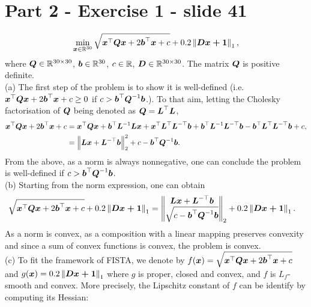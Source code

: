 \section{Part 2 - Exercise 1 - slide 41}
%
\begin{equation*}
    \min_{\boldsymbol x \in \mathbb{R}^{30}} \sqrt{\boldsymbol x^\top \boldsymbol{Qx} + 
    2 \boldsymbol b^\top \boldsymbol x + c} + 0.2 \left\lVert\boldsymbol{Dx+\boldsymbol 1}\right\rVert_{1},
\end{equation*}
%
where $\boldsymbol Q \in \mathbb{R}^{30\times 30}$, $\boldsymbol b\in \mathbb{R}^{30}$, $c\in \mathbb{R}$, $\boldsymbol D
\in \mathbb{R}^{30\times 30}$. The matrix $\boldsymbol Q$ is positive definite. \\

\indent (a) The first step of the problem is to show it is well-defined (i.e. $\boldsymbol x^\top \boldsymbol{Qx} + 
2 \boldsymbol b^\top \boldsymbol x + c\geq 0$ if $c> \boldsymbol b^\top\boldsymbol Q^{-1} \boldsymbol b$.). To that aim, letting the Cholesky factorisation of $\boldsymbol Q$ being denoted as $\boldsymbol Q = \boldsymbol L^\top \boldsymbol L$, 
\begin{align*}
	\boldsymbol x^\top \boldsymbol{Qx} + 
2 \boldsymbol b^\top \boldsymbol x + c &= \boldsymbol x^\top \boldsymbol{Qx} + \boldsymbol b^\top \boldsymbol L^{-1} \boldsymbol{Lx} + \boldsymbol x^\top \boldsymbol L^\top \boldsymbol L^{-\top} \boldsymbol b + \boldsymbol b^{\top} \boldsymbol L^{-1} \boldsymbol L^{-\top} \boldsymbol b - \boldsymbol b^\top \boldsymbol L^\top \boldsymbol L^{-\top} \boldsymbol b + c,\\
&= \left \| \boldsymbol{Lx} + \boldsymbol L^{-\top} \boldsymbol b \right \|_2^2 + c -\boldsymbol b^\top\boldsymbol Q^{-1} \boldsymbol b. 
\end{align*}  
From the above, as a norm is always nonnegative, one can conclude the problem is well-defined if $c> \boldsymbol b^\top\boldsymbol Q^{-1} \boldsymbol b$.   \\
%
\indent (b) Starting from the norm expression, one can obtain 
\begin{align*}
	\sqrt{\boldsymbol x^\top \boldsymbol{Qx} + 
    2 \boldsymbol b^\top \boldsymbol x + c} + 0.2 \left\lVert\boldsymbol{Dx+\boldsymbol 1}\right\rVert_{1} &= \left \| \begin{matrix}
    \boldsymbol{Lx} + \boldsymbol L^{-\top} \boldsymbol b \\
    \sqrt{c -\boldsymbol b^\top\boldsymbol Q^{-1} \boldsymbol b}
    \end{matrix} \right \|_2 + 0.2 \left\lVert\boldsymbol{Dx+\boldsymbol 1}\right\rVert_{1}. 
\end{align*}
As a norm is convex, as a composition with a  linear mapping preserves convexity and since a sum of convex functions is convex, the problem is convex. \\
\indent (c) To fit the framework of FISTA,  we denote by $f(\boldsymbol x) = \sqrt{\boldsymbol x^\top \boldsymbol{Qx} + 
2 \boldsymbol b^\top \boldsymbol x + c}$ and $g(\boldsymbol x) =  0.2 \left\lVert\boldsymbol{Dx+\boldsymbol 1}\right\rVert_{1}$ where $g$ is proper, closed and convex, and $f$ is $L_f$-smooth and convex. More precisely, the Lipschitz constant of $f$ can be identify by computing its Hessian: 
